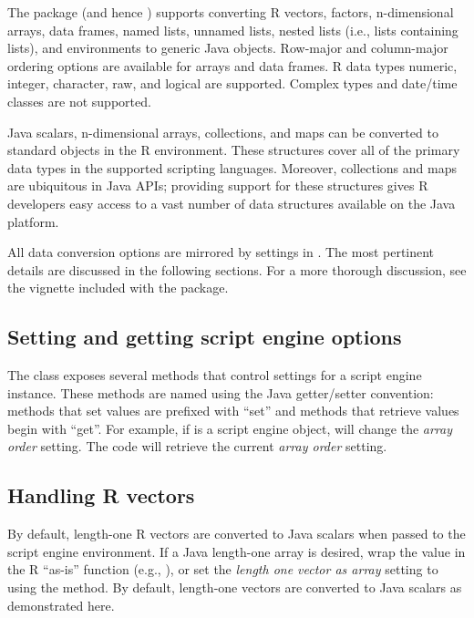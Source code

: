 The  package (and hence ) supports converting R vectors, factors, n-dimensional arrays, data frames, named lists, unnamed lists, nested lists (i.e., lists containing lists), and environments to generic Java objects. Row-major and column-major ordering options are available for arrays and data frames. R data types numeric, integer, character, raw, and logical are supported. Complex types and date/time classes are not supported.

Java scalars, n-dimensional arrays, collections, and maps can be converted to standard objects in the R environment. These structures cover all of the primary data types in the supported scripting languages. Moreover, collections and maps are ubiquitous in Java APIs; providing support for these structures gives R developers easy access to a vast number of data structures available on the Java platform.

All  data conversion options are mirrored by settings in . The most pertinent details are discussed in the following sections. For a more thorough discussion, see the vignette included with the  package.

\subsection{Setting and getting script engine options}

The   class exposes several methods that control settings for a script engine instance. These methods are named using the Java getter/setter convention: methods that set values are prefixed with ``set'' and methods that retrieve values begin with ``get''. For example, if  is a script engine object,  will change the \textit{array order} setting. The code  will retrieve the current \textit{array order} setting.

\hypertarget{handlingrvectors}{\subsection{Handling R vectors}}

By default, length-one R vectors are converted to Java scalars when passed to the script engine environment. If a Java length-one array is desired, wrap the value in the R ``as-is'' function (e.g., ), or set the \textit{length one vector as array} setting to  using the  method. By default, length-one vectors are converted to Java scalars as demonstrated here.

